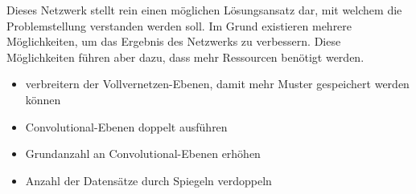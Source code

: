Dieses Netzwerk stellt rein einen möglichen Lösungsansatz dar, mit welchem die Problemstellung verstanden werden soll. 
Im Grund existieren mehrere Möglichkeiten, um das Ergebnis des Netzwerks zu verbessern. 
Diese Möglichkeiten führen aber dazu, dass mehr Ressourcen benötigt werden. 
\begin{itemize}
	\item verbreitern der Vollvernetzen-Ebenen, damit mehr Muster gespeichert werden können
	\item Convolutional-Ebenen doppelt ausführen 
	\item Grundanzahl an Convolutional-Ebenen erhöhen
	\item Anzahl der Datensätze durch Spiegeln verdoppeln
\end{itemize}







